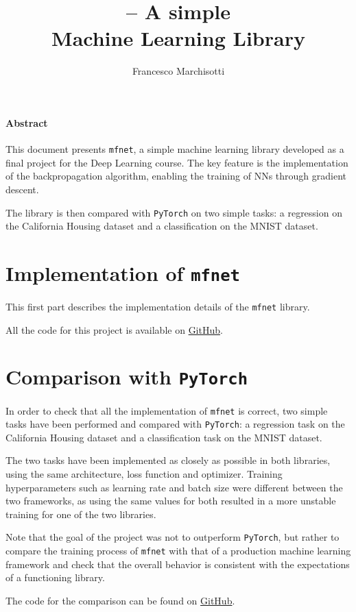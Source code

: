 \documentclass{unitothesis}
\author{Francesco Marchisotti}
\title{\centering\mfnet \sc-- A simple\\[0.5em] Machine Learning Library}
\newcommand{\mono}[1]{\texttt{#1}}
\newcommand{\mfnet}{\mono{mfnet}\xspace}
\newcommand{\pytorch}{\mono{PyTorch}\xspace}
\begin{document}
\maketitlepage
\thispagestyle{empty}
\subsection*{\centering Abstract}
This document presents \mfnet, a simple machine learning library developed as a final project for the Deep Learning course. The key feature is the implementation of the backpropagation algorithm, enabling the training of \aclp*{NN} through gradient descent.

The library is then compared with \pytorch on two simple tasks: a regression on the California Housing dataset and a classification on the MNIST dataset.
\newpage

{\hypersetup{linkcolor=black}\tableofcontents}



\part{Implementation of \mfnet}

This first part describes the implementation details of the \mfnet library.

All the code for this project is available on \href{https://www.github.com/marchfra/mfnet}{GitHub}.









\part{Comparison with \pytorch}

In order to check that all the implementation of \mfnet is correct, two simple tasks have been performed and compared with \pytorch: a regression task on the California Housing dataset and a classification task on the MNIST dataset.

The two tasks have been implemented as closely as possible in both libraries, using the same architecture, loss function and optimizer. Training hyperparameters such as learning rate and batch size were different between the two frameworks, as using the same values for both resulted in a more unstable training for one of the two libraries.

Note that the goal of the project was not to outperform \pytorch, but rather to compare the training process of \mfnet with that of a production machine learning framework and check that the overall behavior is consistent with the expectations of a functioning library.

The code for the comparison can be found on \href{https://github.com/marchfra/interface}{GitHub}.





\appendix

\newpage

\end{document}
